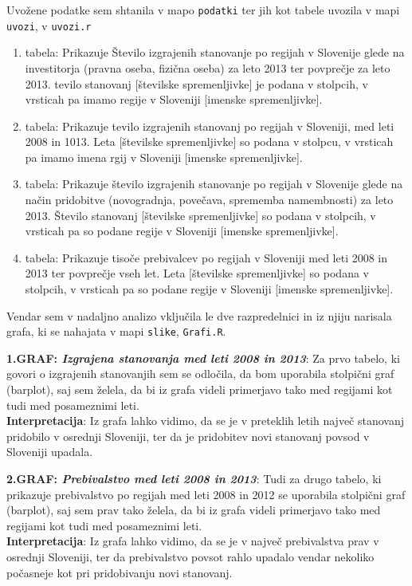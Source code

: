 \documentclass[11pt,a4paper]{article}
\begin{document}
Uvožene podatke sem shtanila v mapo \verb|podatki| ter jih kot tabele uvozila v mapi \verb|uvozi|, v \verb|uvozi.r|

\begin{enumerate}
\item{tabela: Prikazuje Število izgrajenih stanovanje po regijah v Slovenije glede na investitorja (pravna oseba, fizična oseba) za leto 2013 ter povprečje za leto 2013. tevilo stanovanj [številske spremenljivke] je podana v stolpcih, v vrsticah pa imamo regije v Sloveniji [imenske spremenljivke].}
\item{tabela: Prikazuje tevilo izgrajenih stanovanj po regijah v Sloveniji, med leti 2008 in 1013. Leta [številske spremenljivke] so podana v stolpcu, v vrsticah pa imamo imena rgij v Sloveniji [imenske spremenljivke].}
\item{tabela: Prikazuje število izgrajenih stanovanje po regijah v Slovenije glede na način pridobitve (novogradnja, povečava, sprememba namembnosti) za leto 2013. Število stanovanj [številske spremenljivke] so podana v stolpcih, v vrsticah pa so podane regije v Sloveniji [imenske spremenljivke].}
\item{tabela: Prikazuje tisoče prebivalcev po regijah v Sloveniji med leti 2008 in 2013 ter povprečje vseh let. Leta [številske spremenljivke] so podana v stolpcih, v vrsticah pa so podane regije v Sloveniji [imenske spremenljivke].}
\end{enumerate}

Vendar sem v nadaljno analizo vključila le dve razpredelnici in iz njiju narisala grafa, ki se nahajata v mapi \verb|slike|, \verb|Grafi.R|.

\newpage
\textbf{1.GRAF: \emph{Izgrajena stanovanja med leti 2008 in 2013}}: Za prvo tabelo, ki govori o izgrajenih stanovanjih sem se odločila, da bom uporabila stolpični graf (barplot), saj sem želela, da bi iz grafa videli primerjavo tako med regijami kot tudi med posameznimi leti.\\
\textbf{Interpretacija}: Iz grafa lahko vidimo, da se je v preteklih letih največ stanovanj pridobilo v osrednji Sloveniji, ter da je pridobitev novi stanovanj povsod v Sloveniji upadala.

\makebox[\textwidth][c]{

}

\newpage
\textbf{2.GRAF: \emph{Prebivalstvo med leti 2008 in 2013}}: Tudi za drugo tabelo, ki prikazuje prebivalstvo po regijah med leti 2008 in 2012 se uporabila stolpični graf (barplot), saj sem prav tako želela, da bi iz grafa videli primerjavo tako med regijami kot tudi med posameznimi leti.\\
\textbf{Interpretacija}: Iz grafa lahko vidimo, da se je v največ prebivalstva prav v osrednji Sloveniji, ter da prebivalstvo povsot rahlo upadalo vendar nekoliko počasneje kot pri pridobivanju novi stanovanj.
\end{document}
